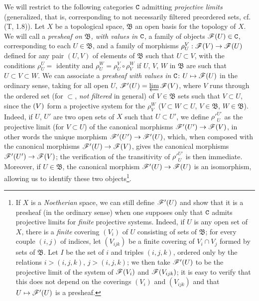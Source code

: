 \begin{env}[3.2.1]
\label{0.3.2.1}
We will restrict to the following categories $\mathtt{C}$ admitting {\em projective
limits} (generalized, that is, corresponding to not necessarily filtered
preordered sets, cf. (T, 1.8)). Let $X$ be a topological space, $\mathfrak{B}$
an open basis for the topology of $X$. We will call a {\em presheaf on
$\mathfrak{B}$, with values in $\mathtt{C}$}, a family of objects $\mathscr{F}(U)\in\mathtt{C}$,
corresponding to each $U\in\mathfrak{B}$, and a family of morphisms $\rho_U^V:\mathscr{F}(V)\to\mathscr{F}(U)$ defined for any pair $(U,V)$ of elements of
$\mathfrak{B}$ such that $U\subset V$,
with the conditions $\rho_U^U=$ identity and $\rho_U^W=\rho_U^V\circ\rho_V^W$ if
$U$, $V$, $W$ in $\mathfrak{B}$ are such that $U\subset V\subset W$. We can
associate a {\em presheaf with values in $\mathtt{C}$}: $U\mapsto\mathscr{F}(U)$ in the
ordinary sense, taking for all open $U$, $\mathscr{F}'(U)=\varprojlim\mathscr{F}(V)$,
where $V$ runs through the ordered set (for $\subset$, {\em not filtered} in
general) of $V\in\mathfrak{B}$ sets such that $V\subset U$, since the $\mathscr(V)$
form a projective system for the $\rho_V^W$ ($V\subset W\subset U$,
$V\in\mathfrak{B}$, $W\in\mathfrak{B}$). Indeed, if $U$, $U'$ are two open sets
of $X$ such that $U\subset U'$, we define ${\rho'}_U^{U'}$ as the projective
limit (for $V\subset U$) of the canonical morphisms $\mathscr{F}'(U')\to\mathscr{F}(V)$,
in other words the unique morphism $\mathscr{F}'(U')\to\mathscr{F}'(U)$, which, when
composed with the canonical morphisms $\mathscr{F}'(U)\to\mathscr{F}(V)$, gives the
canonical morphisms $\mathscr{F}'(U')\to\mathscr{F}(V)$; the verification of the
transitivity of ${\rho'}_U^{U'}$ is then immediate. Moreover, if
$U\in\mathfrak{B}$, the canonical morphism $\mathscr{F}'(U)\to\mathscr{F}(U)$ is an
isomorphism, allowing us to identify these two objects\footnote{If $X$ is a
{\em Noetherian} space, we can still define $\mathscr{F}'(U)$ and show that it is a
presheaf (in the ordinary sense) when one supposes only that $\mathtt{C}$ admits
projective limits for {\em finite} projective systems. Indeed, if $U$ is any
open set of $X$, there is a {\em finite} covering $(V_i)$ of $U$ consisting of
sets of $\mathfrak{B}$; for every couple $(i,j)$ of indices, let $(V_{ijk})$ be
a finite covering of $V_i\cap V_j$ formed by sets of $\mathfrak{B}$. Let $I$ be
the set of $i$ and triples $(i,j,k)$, ordered only by the relations $i>(i,j,k)$,
$j>(i,j,k)$; we then take $\mathscr{F}'(U)$ to be the projective limit of the system
of $\mathscr{F}(V_i)$ and $\mathscr{F}(V_{ijk})$; it is easy to verify that this does not
depend on the coverings $(V_i)$ and $(V_{ijk})$ and that $U\mapsto\mathscr{F}'(U)$ is
a presheaf.}.
\end{env}

